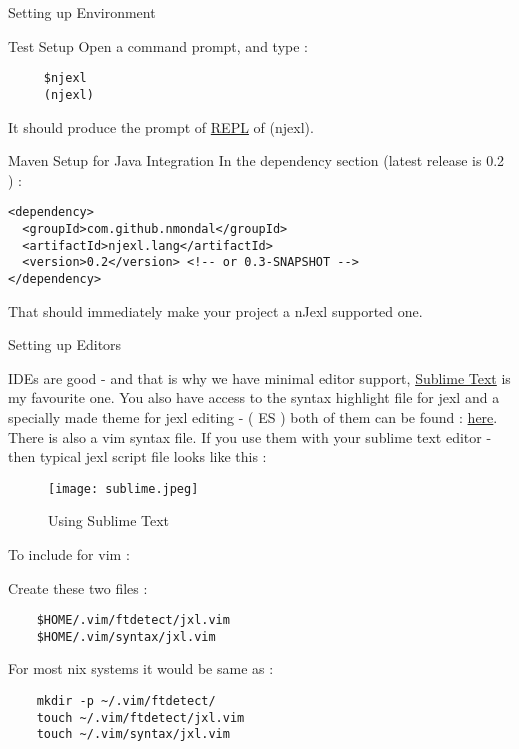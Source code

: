 \begin{section}{Setting up Environment}
\begin{subsection}{Test Setup}
Open a command prompt, and type :

\begin{lstlisting}
     $njexl 
     (njexl)
\end{lstlisting}     

It should produce the prompt of \href{https://en.wikipedia.org/wiki/Read?eval?print_loop}{REPL} of (njexl).

\end{subsection} 

\begin{subsection}{Maven Setup for Java Integration}
In the dependency section (latest release is 0.2 ) : 

\begin{lstlisting}
<dependency>
  <groupId>com.github.nmondal</groupId>
  <artifactId>njexl.lang</artifactId>
  <version>0.2</version> <!-- or 0.3-SNAPSHOT -->
</dependency>
\end{lstlisting}

That should immediately make your project a nJexl supported one. 
\end{subsection} 


\begin{subsection}{Setting up Editors}

IDEs are good - and that is why we have minimal editor support, \href{http://www.sublimetext.com}{Sublime Text} is my favourite one. 
You also have access to the syntax highlight file for jexl and a specially made theme for jexl editing - ( ES ) both of them can be found :   \href{https://github.com/nmondal/njexl/tree/master/doc}{here}. 
There is also a vim syntax file.
If you use them with your sublime text editor - then typical jexl script file looks like this : 

\begin{figure}
\begin{center}
\leavevmode
\texttt{[image: sublime.jpeg]}
\end{center}
\caption{Using Sublime Text}
\label{fig_2_1}
\end{figure}

To include for vim :

Create these two files :

\begin{lstlisting}
    $HOME/.vim/ftdetect/jxl.vim
    $HOME/.vim/syntax/jxl.vim
\end{lstlisting}

For most \*nix systems it would be same as :

\begin{lstlisting}
    mkdir -p ~/.vim/ftdetect/
    touch ~/.vim/ftdetect/jxl.vim 
    touch ~/.vim/syntax/jxl.vim 
\end{lstlisting}


\end{subsection}
\end{section}
